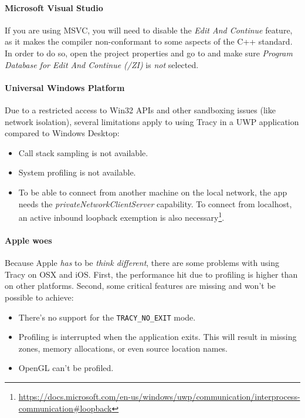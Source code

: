 \documentclass[hidelinks,titlepage,a4paper]{article}
\begin{document}
\paragraph{Microsoft Visual Studio}

If you are using MSVC, you will need to disable the \emph{Edit And Continue} feature, as it makes the compiler non-conformant to some aspects of the C++ standard. In order to do so, open the project properties and go to  and make sure \emph{Program Database for Edit And Continue (/ZI)} is \emph{not} selected.

\paragraph{Universal Windows Platform}

Due to a restricted access to Win32 APIs and other sandboxing issues (like network isolation), several limitations apply to using Tracy in a UWP application compared to Windows Desktop:

\begin{itemize}
\item Call stack sampling is not available.
\item System profiling is not available.
\item To be able to connect from another machine on the local network, the app needs the \emph{privateNetworkClientServer} capability. To connect from localhost, an active inbound loopback exemption is also necessary\footnote{\url{https://docs.microsoft.com/en-us/windows/uwp/communication/interprocess-communication\#loopback}}.
\end{itemize}

\paragraph{Apple woes}

Because Apple \emph{has} to be \emph{think different}, there are some problems with using Tracy on OSX and iOS. First, the performance hit due to profiling is higher than on other platforms. Second, some critical features are missing and won't be possible to achieve:

\begin{itemize}
\item There's no support for the \texttt{TRACY\_NO\_EXIT} mode.
\item Profiling is interrupted when the application exits. This will result in missing zones, memory allocations, or even source location names.
\item OpenGL can't be profiled.
\end{itemize}
\end{document}
